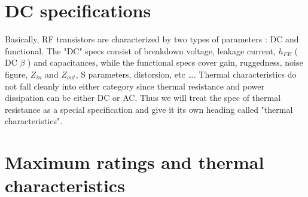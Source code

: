 \section{DC specifications}

Basically, RF transistors are characterized by two types of parameters : DC and functional. The "DC" specs consist of breakdown voltage, leakage current, $h_{FE}$ ( DC $\beta$ ) and capacitances, while the functional specs cover gain, ruggedness, noise figure, $Z_{in}$ and $Z_{out}$, S parameters, distorsion, etc \ldots. Thermal characteristics do not fall cleanly into either category since thermal resistance and power dissipation can be either DC or AC. Thus we will treat the spec of thermal resistance as a special specification and give it its own heading called "thermal characteristics". 

\section{Maximum ratings and thermal characteristics}

